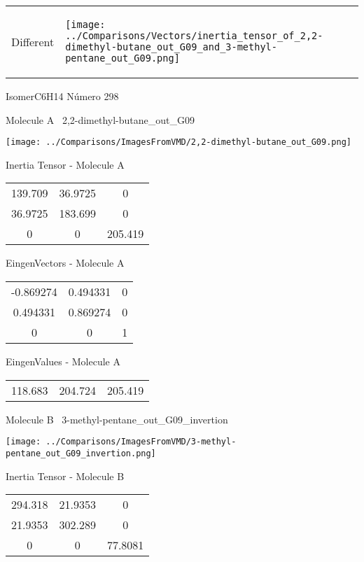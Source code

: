 \vtab[-5mm]
\begin{tabular}{*{2}{m{}}}
\begin{center}
\textcolor{NavyBlue}{\Large Different}
\end{center}
&
\begin{center}
\texttt{[image: ../Comparisons/Vectors/inertia\_tensor\_of\_2,2-dimethyl-butane\_out\_G09\_and\_3-methyl-pentane\_out\_G09.png]}
\end{center}
\end{tabular}

 \newpage

\vtab[-3cm]
\begin{center}
{\large IsomerC6H14 \tab Número 298}
\end{center}
\begin{multicols}{2}
\begin{center}

Molecule A \
2,2-dimethyl-butane\_out\_G09

\texttt{[image: ../Comparisons/ImagesFromVMD/2,2-dimethyl-butane\_out\_G09.png]}

Inertia Tensor - Molecule A \\
\begin{tabular}{|c c c|}
139.709	 & 	36.9725	 & 	0	 \\
36.9725	 & 	183.699	 & 	0	 \\
0	 & 	0	 & 	205.419
\end{tabular}

\vtab
 EingenVectors - Molecule A     \\
\begin{tabular}{|c c c|}
-0.869274	 & 	0.494331	 & 	0	 \\
0.494331	 & 	0.869274	 & 	0	 \\
0	 & 	0	 & 	1
\end{tabular}

\vtab
 EingenValues - Molecule A     \\
\begin{tabular}{|c c c|}
118.683	 & 	204.724	 & 	205.419	 \\
\end{tabular}
\columnbreak

Molecule B \
3-methyl-pentane\_out\_G09\_invertion

\texttt{[image: ../Comparisons/ImagesFromVMD/3-methyl-pentane\_out\_G09\_invertion.png]}

Inertia Tensor - Molecule B \\
\begin{tabular}{|c c c|}
294.318	 & 	21.9353	 & 	0	 \\
21.9353	 & 	302.289	 & 	0	 \\
0	 & 	0	 & 	77.8081
\end{tabular}


\end{center}
\end{multicols}
